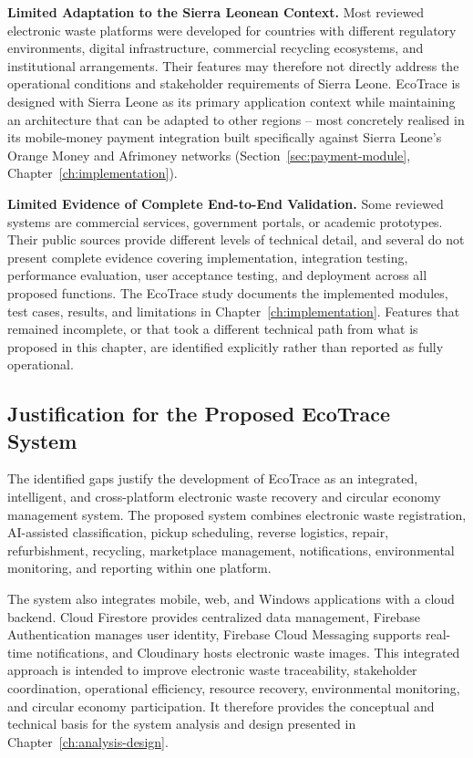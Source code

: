 \textbf{Limited Adaptation to the Sierra Leonean Context.} Most reviewed
electronic waste platforms were developed for countries with different regulatory
environments, digital infrastructure, commercial recycling ecosystems, and
institutional arrangements. Their features may therefore not directly address the
operational conditions and stakeholder requirements of Sierra Leone. EcoTrace is
designed with Sierra Leone as its primary application context while maintaining
an architecture that can be adapted to other regions -- most concretely realised in
its mobile-money payment integration built specifically against Sierra Leone's
Orange Money and Afrimoney networks (Section~\ref{sec:payment-module}, Chapter~\ref{ch:implementation}).

\textbf{Limited Evidence of Complete End-to-End Validation.} Some reviewed
systems are commercial services, government portals, or academic prototypes.
Their public sources provide different levels of technical detail, and several do not
present complete evidence covering implementation, integration testing,
performance evaluation, user acceptance testing, and deployment across all
proposed functions. The EcoTrace study documents the implemented modules,
test cases, results, and limitations in Chapter~\ref{ch:implementation}. Features
that remained incomplete, or that took a different technical path from what is
proposed in this chapter, are identified explicitly rather than reported as fully
operational.

\subsection{Justification for the Proposed EcoTrace System}

The identified gaps justify the development of EcoTrace as an integrated,
intelligent, and cross-platform electronic waste recovery and circular economy
management system. The proposed system combines electronic waste
registration, AI-assisted classification, pickup scheduling, reverse logistics,
repair, refurbishment, recycling, marketplace management, notifications,
environmental monitoring, and reporting within one platform.

The system also integrates mobile, web, and Windows applications with a
cloud backend. Cloud Firestore provides centralized data management, Firebase
Authentication manages user identity, Firebase Cloud Messaging supports
real-time notifications, and Cloudinary hosts electronic waste images. This
integrated approach is intended to improve electronic waste traceability,
stakeholder coordination, operational efficiency, resource recovery,
environmental monitoring, and circular economy participation. It therefore
provides the conceptual and technical basis for the system analysis and design
presented in Chapter~\ref{ch:analysis-design}.

